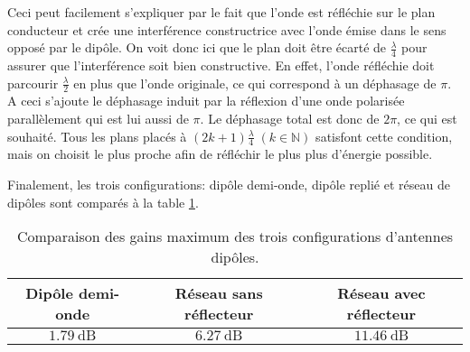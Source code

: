 Ceci peut facilement s'expliquer par le fait que l'onde est réfléchie sur le plan conducteur et crée une interférence constructrice avec l'onde émise dans le sens opposé par le dipôle. On voit donc ici que le plan doit être écarté de $\frac{\lambda}{4}$ pour assurer que l'interférence soit bien constructive. En effet, l'onde réfléchie doit parcourir $\frac{\lambda}{2}$ en plus que l'onde originale, ce qui correspond à un déphasage de $\pi$. A ceci s'ajoute le déphasage induit par la réflexion d'une onde polarisée parallèlement qui est lui aussi de $\pi$. Le déphasage total est donc de $2\pi$, ce qui est souhaité. Tous les plans placés à $(2k+1)\frac{\lambda}{4} \; (k \in \mathbb{N})$ satisfont cette condition, mais on choisit le plus proche afin de réfléchir le plus plus d'énergie possible.

Finalement, les trois configurations: dipôle demi-onde, dipôle replié et réseau de dipôles sont comparés à la table \ref{tbl:comp}.
\begin{table}[htbp]
\begin{tabular}{ccc}
  \hline
       Dipôle demi-onde & Réseau sans réflecteur & Réseau avec réflecteur \\
  \hline
  $\SI{1.79}{\deci\bel}$ & $\SI{6.27}{\deci\bel}$ & $\SI{11.46}{\deci\bel}$ \\
  \hline
\end{tabular}
\caption{Comparaison des gains maximum des trois configurations d'antennes dipôles.\label{tbl:comp}}
\end{table}


